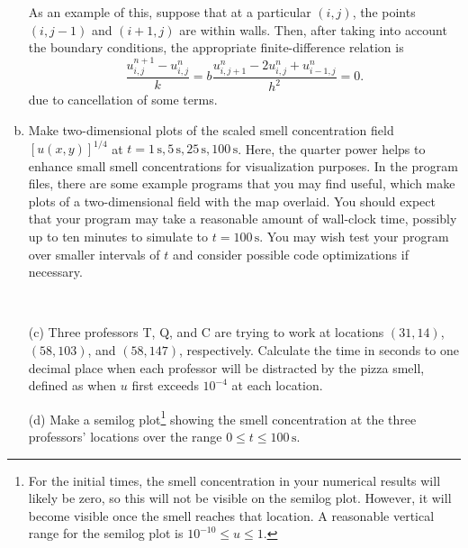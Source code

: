 \documentclass{article}
\begin{document}
\begin{problem}
\begin{enumerate}[(a)]
                As an example of this, suppose that at a particular $(i,j)$, the points
                $(i,j-1)$ and $(i+1,j)$ are within walls. Then, after taking into
                account the boundary conditions, the appropriate finite-difference
                relation is
                \begin{equation}
                  \frac{u_{i,j}^{n+1} - u_{i,j}^n}{k} = b \frac{u_{i,j+1}^n - 2u_{i,j}^n + u_{i-1,j}^n}{h^2} = 0. \label{eq:2ddiffrest}
                \end{equation}
                due to cancellation of some terms.
          \item Make two-dimensional plots of the scaled smell concentration field
                $[u(x,y)]^{1/4}$ at $t=1\,\text{s}, 5\,\text{s}, 25\,\text{s},
                  100\,\text{s}$. Here, the quarter power helps to enhance small smell
                concentrations for visualization purposes. In the program files, there
                are some example programs that you may find useful, which make plots of a
                two-dimensional field with the map overlaid. You should expect that your
                program may take a reasonable amount of wall-clock time, possibly up to
                ten minutes to simulate to $t=100\,\text{s}$. You may wish test your
                program over smaller intervals of $t$ and consider possible code
                optimizations if necessary.
        \end{enumerate}
\end{problem}


\begin{problem}[4 Continued] \\
    \begin{enumerate}
        \item[(c)] Three professors T, Q, and C are trying to work at locations $(31,14)$,
                $(58,103)$, and $(58,147)$, respectively. Calculate the time in seconds to one decimal
                place when each professor will be distracted by the pizza smell, defined as
                when $u$ first exceeds $10^{-4}$ at each location.
          \item[(d)] Make a semilog plot\footnote{For the initial times, the smell
                  concentration in your numerical results will likely be zero, so this will
                  not be visible on the semilog plot. However, it will become visible once
                  the smell reaches that location. A reasonable vertical range for the
                  semilog plot is $10^{-10} \le u \le 1$.} showing the smell concentration at
                the three professors' locations over the range $0 \le t \le 100\,\text{s}$.
    \end{enumerate}
\end{problem}
\end{document}
